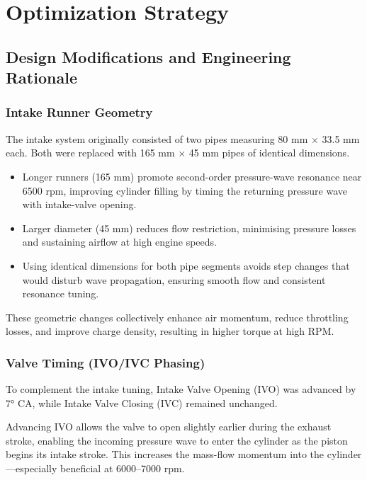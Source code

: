 \section{Optimization Strategy}

\subsection{Design Modifications and Engineering Rationale}

\subsubsection{Intake Runner Geometry}

The intake system originally consisted of two pipes measuring 80 mm $\times$ 33.5 mm each. Both were replaced with 165 mm $\times$ 45 mm pipes of identical dimensions.

\begin{itemize}
    \item Longer runners (165 mm) promote second-order pressure-wave resonance near 6500 rpm, improving cylinder filling by timing the returning pressure wave with intake-valve opening.
    \item Larger diameter (45 mm) reduces flow restriction, minimising pressure losses and sustaining airflow at high engine speeds.
    \item Using identical dimensions for both pipe segments avoids step changes that would disturb wave propagation, ensuring smooth flow and consistent resonance tuning.
\end{itemize}

These geometric changes collectively enhance air momentum, reduce throttling losses, and improve charge density, resulting in higher torque at high RPM.

\subsubsection{Valve Timing (IVO/IVC Phasing)}

To complement the intake tuning, Intake Valve Opening (IVO) was advanced by 7° CA, while Intake Valve Closing (IVC) remained unchanged.

Advancing IVO allows the valve to open slightly earlier during the exhaust stroke, enabling the incoming pressure wave to enter the cylinder as the piston begins its intake stroke. This increases the mass-flow momentum into the cylinder—especially beneficial at 6000--7000 rpm.

